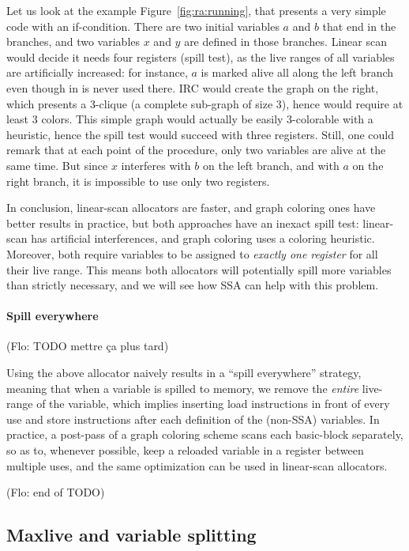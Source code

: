 {Let us look at the example Figure~\ref{fig:ra:running}, that presents a very simple code with an if-condition.
There are two initial variables $a$ and $b$ that end in the branches, and two variables $x$ and $y$ are defined in those branches.
Linear scan would decide it needs four registers (spill test), as the live ranges of all variables are artificially increased: for instance, $a$ is marked alive all along the left branch even though in is never used there.
%
IRC would create the graph on the right, which presents a 3-clique (a complete sub-graph of size 3), hence would require at least 3 colors.
This simple graph would actually be easily 3-colorable with a heuristic, hence the spill test would succeed with three registers.
%
Still, one could remark that at each point of the procedure, only two variables are alive at the same time.
But since $x$ interferes with $b$ on the left branch, and with $a$ on the right branch, it is impossible to use only two registers.

\medskip

In conclusion, linear-scan allocators are faster, and graph coloring ones have better results in practice, but both approaches have an inexact spill test: linear-scan has artificial interferences, and graph coloring uses a coloring heuristic.
Moreover, both require variables to be assigned to \emph{exactly one register} for all their live range.
This means both allocators will potentially spill more variables than strictly necessary, and we will see how SSA can help with this problem.



\paragraph{Spill everywhere}
(Flo: TODO mettre ça plus tard)

Using the above allocator naively results in a ``spill everywhere'' strategy, meaning that when a variable is spilled to memory, we remove the \emph{entire} live-range of the variable, which implies inserting load instructions in front of every use and store instructions after each definition of the (non-SSA) variables.
In practice, a post-pass of a graph coloring scheme scans each basic-block separately, so as to, whenever possible, keep a reloaded variable in a register between multiple uses, and the same optimization can be used in linear-scan allocators.

(Flo: end of TODO)


\subsection{Maxlive and variable splitting}




}
